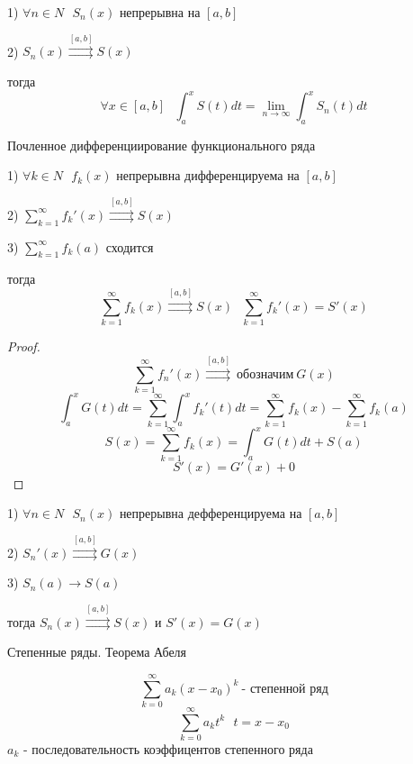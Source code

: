 \begin{theorem}
  1) $\forall n \in N ~~~ S_n(x)$ непрерывна на $[a,b]$

  2) $S_n(x) \stackrel{[a, b]}{\rightrightarrows} S(x)$

  тогда
  $$
  \forall x \in [a,b] ~~~ \int_a^x S(t)dt = \lim_{n \to \infty}
  \int_a^x S_n(t)dt
  $$
\end{theorem}

\begin{title}[\Large]
  Почленное дифференциирование функционального ряда
\end{title}

\begin{theorem}
  1) $\forall k \in N ~~~ f_k(x)$ непрерывна дифференцируема на $[a,b]$

  2) $\sum_{k=1}^{\infty} f_k'(x) \stackrel{[a, b]}{\rightrightarrows} S(x)$

  3) $\sum_{k=1}^{\infty} f_k(a)$ сходится

  тогда
  $$
  \sum_{k=1}^{\infty} f_k(x) \stackrel{[a, b]}{\rightrightarrows} S(x) ~~~
  \sum_{k=1}^{\infty} f_k'(x) = S'(x)
  $$
\end{theorem}

\begin{proof}
  $$
  \sum_{k=1}^{\infty} f_n'(x) \stackrel{[a,b]}{\rightrightarrows} ~
  \text{обозначим} ~ G(x)
  $$
  $$
  \int_a^x G(t)dt = \sum_{k=1}^{\infty} \int_a^x f_k'(t) dt =
  \sum_{k=1}^{\infty} f_k(x) - \sum_{k=1}^{\infty} f_k(a)
  $$
  $$
  S(x) = \sum_{k=1}^{\infty} f_k(x) = \int_a^x G(t)dt + S(a)
  $$
  $$
  S'(x) = G'(x) + 0
  $$
\end{proof}

\begin{theorem}
  1) $\forall n \in N ~~~ S_n(x)$ непрерывна дефференцируема на $[a,b]$

  2) $S_n'(x) \stackrel{[a,b]}{\rightrightarrows} G(x)$

  3) $S_n(a) \to S(a)$

  тогда $S_n(x) \stackrel{[a,b]}{\rightrightarrows} S(x)$ и $S'(x) = G(x)$
\end{theorem}

\begin{title}[\Large]
  Степенные ряды. Теорема Абеля
\end{title}

\begin{define}
  $$
  \sum_{k=0}^{\infty} a_k (x-x_0)^k ~ \text{- степенной ряд}
  $$
  $$
  \sum_{k=0}^{\infty} a_k t^k ~~~ t = x - x_0
  $$
  $a_k$ - последовательность коэффицентов степенного ряда
\end{define}

